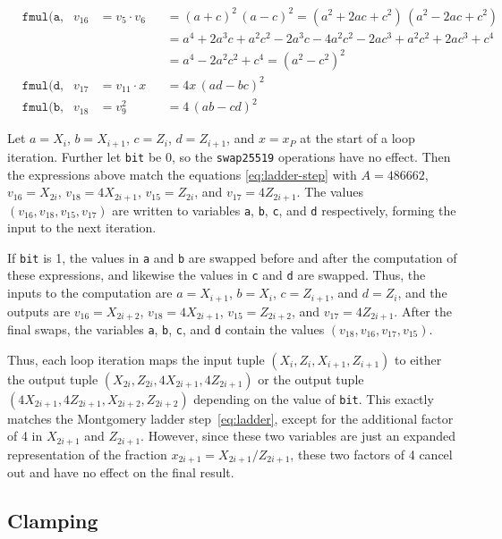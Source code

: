\documentclass[manuscript]{acmart}
\begin{document}
\begin{align*}
    & \texttt{fmul(a, d, f);} & v_{16} &= v_5 \cdot v_6  &&= (a + c)^2\,(a - c)^2 = (a^2 + 2ac + c^2)\,(a^2 - 2ac + c^2) \\
    &                       &        &                 &&= a^4 + 2a^3 c + a^2 c^2 - 2a^3 c - 4 a^2 c^2 - 2a c^3 + a^2 c^2 + 2a c^3 + c^4 \\
    &                       &        &                 &&= a^4 - 2a^2 c^2 + c^4 = (a^2 - c^2)^2 \\
    & \texttt{fmul(d, b, x);} & v_{17} &= v_{11} \cdot x &&= 4x\,(ad - bc)^2 \\
    & \texttt{fmul(b, e, e);} & v_{18} &= v_9^2          &&= 4\,(ab - cd)^2
\end{align*}
\endgroup

Let $a = X_i$, $b = X_{i+1}$, $c = Z_i$, $d = Z_{i+1}$, and $x = x_P$ at the start of a loop iteration.
Further let \verb|bit| be 0, so the \verb|swap25519| operations have no effect.
Then the expressions above match the equations \eqref{eq:ladder-step} with $A = 486662$, $v_{16} = X_{2i}$, $v_{18} = 4X_{2i+1}$, $v_{15} = Z_{2i}$, and $v_{17} = 4Z_{2i+1}$.
The values $(v_{16}, v_{18}, v_{15}, v_{17})$ are written to variables \verb|a|, \verb|b|, \verb|c|, and \verb|d| respectively, forming the input to the next iteration.

If \verb|bit| is 1, the values in \verb|a| and \verb|b| are swapped before and after the computation of these expressions, and likewise the values in \verb|c| and \verb|d| are swapped.
Thus, the inputs to the computation are $a = X_{i+1}$, $b = X_i$, $c = Z_{i+1}$, and $d = Z_i$, and the outputs are $v_{16} = X_{2i+2}$, $v_{18} = 4X_{2i+1}$, $v_{15} = Z_{2i+2}$, and $v_{17} = 4Z_{2i+1}$.
After the final swaps, the variables \verb|a|, \verb|b|, \verb|c|, and \verb|d| contain the values $(v_{18}, v_{16}, v_{17}, v_{15})$.

Thus, each loop iteration maps the input tuple $(X_i, Z_i, X_{i+1}, Z_{i+1})$ to either the output tuple $(X_{2i}, Z_{2i}, 4X_{2i+1}, 4Z_{2i+1})$ or the output tuple $(4X_{2i+1}, 4Z_{2i+1}, X_{2i+2}, Z_{2i+2})$ depending on the value of \verb|bit|.
This exactly matches the Montgomery ladder step~\eqref{eq:ladder}, except for the additional factor of 4 in $X_{2i+1}$ and $Z_{2i+1}$.
However, since these two variables are just an expanded representation of the fraction $x_{2i+1} = X_{2i+1}/Z_{2i+1}$, these two factors of 4 cancel out and have no effect on the final result.

\subsection{Clamping}\label{sec:clamping}
\end{document}
